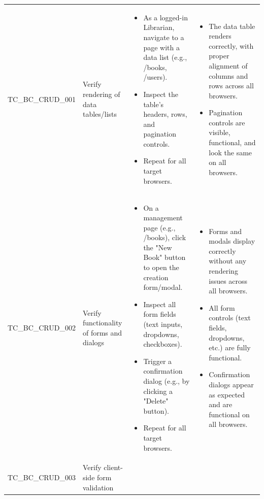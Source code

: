 \begin{longtable}{|>{\scriptsize\raggedright\arraybackslash}p{3cm}|>{\raggedright\arraybackslash}p{3.5cm}|>{\raggedright\arraybackslash}p{4cm}|>{\raggedright\arraybackslash}p{5cm}|}
\multicolumn{4}{|l|}{\textbf{Sub-Section: Core Functionality (CRUD Operations)}} \\ \hline
TC\_BC\_CRUD\_001 & Verify rendering of data tables/lists & 
    \begin{itemize}[noitemsep, topsep=0pt, partopsep=0pt, leftmargin=*]
        \item As a logged-in Librarian, navigate to a page with a data list (e.g., /books, /users).
        \item Inspect the table's headers, rows, and pagination controls.
        \item Repeat for all target browsers.
    \end{itemize} & 
    \begin{itemize}[noitemsep, topsep=0pt, partopsep=0pt, leftmargin=*]
        \item The data table renders correctly, with proper alignment of columns and rows across all browsers.
        \item Pagination controls are visible, functional, and look the same on all browsers.
    \end{itemize} \\ \hline
TC\_BC\_CRUD\_002 & Verify functionality of forms and dialogs & 
    \begin{itemize}[noitemsep, topsep=0pt, partopsep=0pt, leftmargin=*]
        \item On a management page (e.g., /books), click the "New Book" button to open the creation form/modal.
        \item Inspect all form fields (text inputs, dropdowns, checkboxes).
        \item Trigger a confirmation dialog (e.g., by clicking a "Delete" button).
        \item Repeat for all target browsers.
    \end{itemize} & 
    \begin{itemize}[noitemsep, topsep=0pt, partopsep=0pt, leftmargin=*]
        \item Forms and modals display correctly without any rendering issues across all browsers.
        \item All form controls (text fields, dropdowns, etc.) are fully functional.
        \item Confirmation dialogs appear as expected and are functional on all browsers.
    \end{itemize} \\ \hline
TC\_BC\_CRUD\_003 & Verify client-side form validation & 

\end{longtable}
